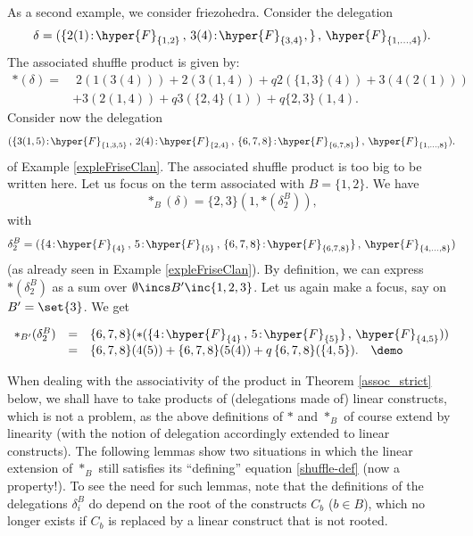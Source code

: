 \begin{example} \label{expleFriseProduit}  As a second example, we consider  friezohedra.  Consider the delegation $$\delta=(\{2(1)\!:\! \hyper{F}_{\{1,2\}}\,,\, 3(4)\!:\! \hyper{F}_{\{3,4\}},  \}\,,\, \hyper{F}_{\{1,\ldots,4\}}).$$ The associated   shuffle product is given by:
\begin{align*}
\ast(\delta)= &\;2(1(3(4))) + 2(3(1,4)) + q2(\{1,3\}(4))+ 3(4(2(1)))\\
& +3(2(1,4)) + q3(\{2,4\}(1)) + q\{2,3\}(1,4).
\end{align*}
Consider now the delegation 
\begin{equation*}
(\{3(1,5) \!:\! \hyper{F}_{\{1,3,5\}}\,,\,2(4) \!:\! \hyper{F}_{\{2,4\}} \,,\,\{6,7,8\} \!:\! \hyper{F}_{\{6,7,8\}}\}\,,\, \hyper{F}_{\{1,\ldots,8\}}).
\end{equation*}
of Example \ref{expleFriseClan}.
 The associated   shuffle product is too big to be written here. Let us focus on the term associated with $B=\{1,2\}$. 
 We have  $$\ast_B(\delta)=\{2,3\}(1, \ast(\delta_2^B)),$$  with  $$\delta_2^B=(\{ 4 \!:\! \hyper{F}_{\{4\}}\,,\, 5 \!:\! \hyper{F}_{\{5\}}\,,\, \{6,7,8\} \!:\! \hyper{F}_{\{6,7,8\}}\}\,,\, \hyper{F}_{\{4,\ldots, 8\}})$$  (as already seen in Example \ref{expleFriseClan}). By definition, we can express $\ast(\delta_2^B)$   as a sum over $\emptyset \incs B' \inc \{1,2,3\}$. Let us  again make a focus, say on $B'=\set{3}$. We get 
 
$$\begin{array}{rcl}
\ast_{B'}(\delta_2^B)&=&\{6,7,8\}(\ast(\{4 \!:\! \hyper{F}_{\{4\}}\,,\, 5 \!:\! \hyper{F}_{\{5\}}\}\,,\, \hyper{F}_{\{4,5\}})) \\
& = &\{6,7,8\}(4(5)) + \{6,7,8\}(5(4)) + q \,\{6,7,8\}(\{4,5\}). \quad\demo
\end{array}$$

\end{example}

When dealing with the associativity of the   product in Theorem \ref{assoc_strict} below, we shall have to take    products of (delegations made of)  linear constructs, which is not a problem, as the above definitions of $\ast$ and $\ast_B$ of course extend by linearity (with the notion of delegation accordingly extended to linear constructs). 
 The following lemmas show two situations in which the linear extension of $\ast_B$ still satisfies its ``defining'' equation \ref{shuffle-def}
(now a property!). To see the need for such  lemmas, note that the definitions of the delegations $\delta^B_i$ do depend on the root of the constructs $C_b$ ($b\in B$), which no longer exists if $C_b$ is replaced by a linear construct that is not rooted.
 
